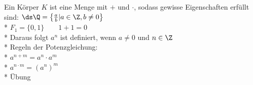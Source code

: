 %
\wdh
Ein Körper $K$ ist eine Menge mit $+$ und $·$, sodass gewisse Eigenschaften erfüllt sind:
\bsp
$\ds\Q = \left\{\frac{a}{b} | a \in \Z, b \neq 0\right\}$\\*
$F_1 = \{0, 1\} \qquad 1 + 1 = 0$\\*
Daraus folgt $a^n$ ist definiert, wenn $a \neq 0$ und $n \in \Z$\\*
Regeln der Potenzgleichung:\\*
$a^{n+m} = a^n \cdot a^m$\\*
$a^{n \cdot m} = (a^{n})^m$\\*
\bew
Übung

